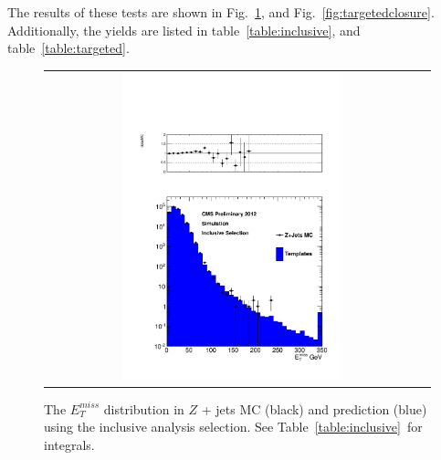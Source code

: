 The results of these tests are shown in Fig.~\ref{fig:inclusiveclosure}, and Fig.~\ref{fig:targetedclosure}. Additionally, the yields are listed
in table~\ref{table:inclusive}, and table~\ref{table:targeted}.
\begin{figure}[!h]
\begin{center}
\begin{tabular}{cc}
\includegraphics[width=0.6\textwidth]{plots/closure_inclusive.pdf}
\end{tabular}
\caption{The $E^{miss}_T$ distribution in $Z$ + jets MC (black) and prediction (blue) using the inclusive analysis selection. See Table~\ref{table:inclusive}~for integrals.
\label{fig:inclusiveclosure}
}
\end{center}
\end{figure}

